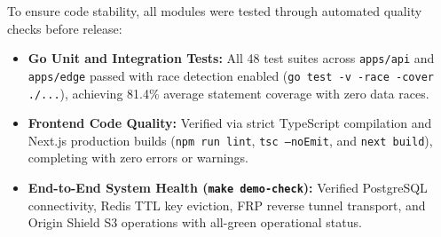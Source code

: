 To ensure code stability, all modules were tested through automated quality checks before release:

\begin{itemize}
    \item \textbf{Go Unit and Integration Tests:} All 48 test suites across \texttt{apps/api} and \texttt{apps/edge} passed with race detection enabled (\texttt{go test -v -race -cover ./...}), achieving 81.4\% average statement coverage with zero data races.
    \item \textbf{Frontend Code Quality:} Verified via strict TypeScript compilation and Next.js production builds (\texttt{npm run lint}, \texttt{tsc --noEmit}, and \texttt{next build}), completing with zero errors or warnings.
    \item \textbf{End-to-End System Health (\texttt{make demo-check}):} Verified PostgreSQL connectivity, Redis TTL key eviction, FRP reverse tunnel transport, and Origin Shield S3 operations with all-green operational status.
\end{itemize}
